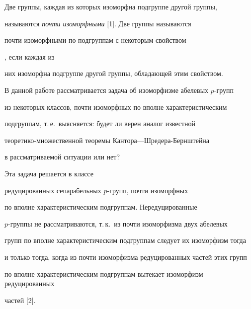 \date{}




\pagestyle{plain} %







\maketitle


\label{begin}





Две группы, каждая из которых изоморфна подгруппе другой группы,


называются {\it почти изоморфными} [1]. Две группы называются {\it


почти изоморфными по подгруппам с некоторым свойством}, если каждая из


них изоморфна подгруппе другой группы, обладающей этим свойством.


В данной работе рассматривается задача об изоморфизме абелевых $p$-групп


из некоторых классов, почти изоморфных по вполне характеристическим


подгруппам, т.\,е.\ выясняется: будет ли верен аналог известной


теоретико-множественной теоремы Кантора---Шредера-Бернштейна


в рассматриваемой ситуации или нет?





Эта задача решается в классе


редуцированных сепарабельных $p$-групп, почти изоморфных


по вполне характеристическим подгруппам. Нередуцированные


$p$-группы не рассматриваются, т.\,к.\ из почти изоморфизма двух абелевых


групп по вполне характеристическим подгруппам следует их изоморфизм тогда


и только тогда, когда из почти изоморфизма редуцированных частей этих групп


по вполне характеристическим подгруппам вытекает изоморфизм редуцированных


частей [2].






